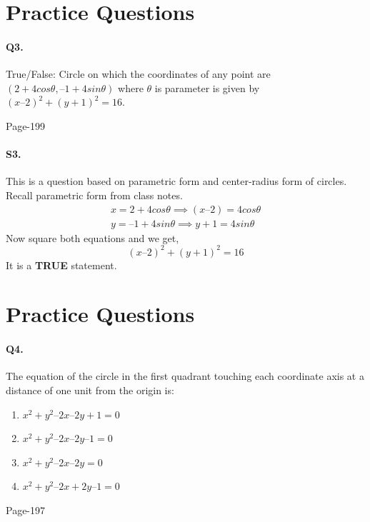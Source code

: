 \documentclass{article}
\begin{document}
\section*{Practice Questions}
\paragraph{Q3.}True/False: Circle on which the coordinates of any point are $(2 + 4 cos\theta, –1 +
4 sin\theta)$ where $\theta$ is parameter is given by $(x – 2)^2 + (y + 1)^2 = 16$. 
\begin{flushright}
Page-199
\end{flushright}
\paragraph{S3.}
This is a question based on parametric form and center-radius form of circles. Recall parametric form from class notes.
\begin{align*}
    x=2 + 4 cos\theta \implies (x – 2) = 4 cos\theta \\
    y = –1 + 4 sin\theta \implies y + 1 = 4 sin\theta
\end{align*}
Now square both equations and we get,
\begin{equation*}
    (x – 2)^2 + (y + 1)^2 = 16
\end{equation*}
It is a \textbf{TRUE} statement.
\clearpage
\section*{Practice Questions}
\paragraph{Q4.}The equation of the circle in the first quadrant touching each coordinate axis at a distance of one unit from the origin is:
\begin{enumerate}
    \item $x^2 + y^2 – 2x – 2y + 1= 0$
    \item $x^2 + y^2 – 2x – 2y – 1 = 0$
    \item $x^2+ y^2 – 2x – 2y = 0$
    \item $x^2 + y^2 – 2x + 2y – 1 = 0$
\end{enumerate}
\begin{flushright}
Page-197
\end{flushright}
\end{document}
